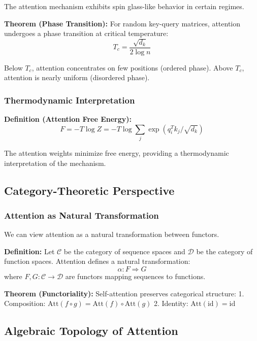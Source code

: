 \documentclass[11pt]{article}
\begin{document}
The attention mechanism exhibits spin glass-like behavior in certain regimes.

\textbf{Theorem (Phase Transition):} For random key-query matrices, attention undergoes a phase transition at critical temperature:
\begin{equation}
T_c = \frac{\sqrt{d_k}}{2\log n}
\end{equation}

Below $T_c$, attention concentrates on few positions (ordered phase). Above $T_c$, attention is nearly uniform (disordered phase).

\subsubsection{Thermodynamic Interpretation}

\textbf{Definition (Attention Free Energy):}
\begin{equation}
F = -T \log Z = -T \log \sum_j \exp(q_i^T k_j / \sqrt{d_k})
\end{equation}

The attention weights minimize free energy, providing a thermodynamic interpretation of the mechanism.

\subsection{Category-Theoretic Perspective}

\subsubsection{Attention as Natural Transformation}

We can view attention as a natural transformation between functors.

\textbf{Definition:} Let $\mathcal{C}$ be the category of sequence spaces and $\mathcal{D}$ be the category of function spaces. Attention defines a natural transformation:
\begin{equation}
\alpha: F \Rightarrow G
\end{equation}
where $F, G: \mathcal{C} \rightarrow \mathcal{D}$ are functors mapping sequences to functions.

\textbf{Theorem (Functoriality):} Self-attention preserves categorical structure:
1. Composition: $\text{Att}(f \circ g) = \text{Att}(f) \circ \text{Att}(g)$
2. Identity: $\text{Att}(\text{id}) = \text{id}$

\subsection{Algebraic Topology of Attention}
\end{document}
